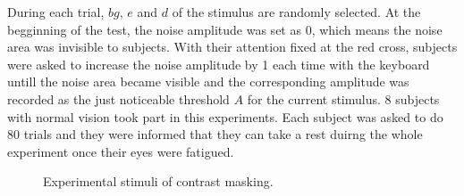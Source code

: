 \documentclass[journal]{IEEEtran}
\begin{document}
During each trial, $bg$, $e$ and $d$ of the stimulus are randomly selected. At the begginning of the test, the noise amplitude was set as 0, which means the noise area was invisible to subjects. With their attention fixed at the red cross, subjects were asked to increase the noise amplitude by 1 each time with the keyboard untill the noise area became visible and the corresponding amplitude was recorded as the just noticeable threshold $A$ for the current stimulus. 8 subjects with normal vision took part in this experiments. Each subject was asked to do 80 trials and they were informed that they can take a rest duirng the whole experiment once their eyes were fatigued.
\begin{figure}[!t]
	\centering
	\caption{Experimental stimuli of contrast masking.}
	\label{fig:ContrastSketch}
\end{figure}
\end{document}
